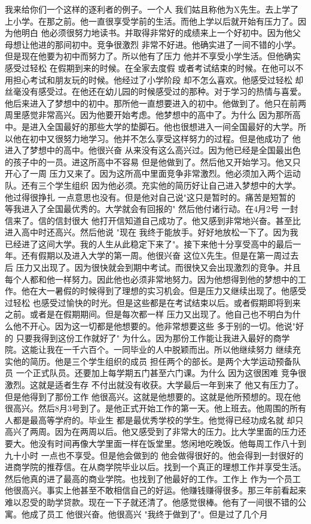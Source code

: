 我来给你们一个这样的逐利者的例子。一个人 我们姑且称他为X先生。去上学了 上小学。在那之前。他一直很享受学前的生活。而他上学以后就开始有压力了。因为他明白 他必须很努力地读书。并取得非常好的成绩来上一个好初中。因为他父母想让他进的那间初中。竞争很激烈 非常不好进。他确实进了一间不错的小学。但是现在他要为初中而努力了。所以他有了压力 他并不享受小学生活。但他确实感受过轻松 在假期到来的时候。在全家去度假 或者考试结束的时候。在他可以不用担心考试和朋友玩的时候。他经过了小学阶段 却不怎么喜欢。他感受过轻松 却丝毫没有感受过。在他还在幼儿园的时候感受过的那种。对于学习的热情与喜爱。他后来进入了梦想中的初中。那所他一直想要进入的初中。他做到了。他只在前两周里感觉非常高兴。因为他要开始考虑。他梦想中的高中了。为什么 因为那所高中。是进入全国最好的那些大学的垫脚石。他也很想进入一间全国最好的大学。所以他在初中又很努力地学习。他并不怎么享受这样努力的过程。但是他成功了 他进入了梦想中的高中。他很兴奋 从来没有这么高兴过。因为他已经是全国最出色的孩子中的一员。进这所高中不容易 但是他做到了。然后他又开始学习。他又只开心了一周 压力又来了。因为这所高中里面竞争非常激烈。他必须加入两个运动队。还有三个学生组织 因为他必须。充实他的简历好让自己进入梦想中的大学。他过得很挣扎 一点意思也没有。但是他对自己说"这只是暂时的。痛苦是短暂的 等我进入了全国最优秀的。大学就会有回报的" 然后他付诸行动。在4月2号 一封信来了。信的信封很大 他打开信知道自己成功了。他又感到非常地兴奋。甚至比进入高中时还高兴。然后他说 "现在 我终于能放手。好好地放松一下了。因为我已经进了这间大学。我的人生从此稳定下来了"。接下来他十分享受高中的最后一年。还有假期以及进入大学的第一周。他很兴奋 这位X先生。但是在第一周过去后 压力又出现了。因为很快就会到期中考试。而很快又会出现激烈的竞争。并且每个人都和他一样努力。因此他也必须非常地努力。因为他想得到他的梦想中的工作。他在大一暑假的时候得到了理想的实习机会。但是压力又继续出现了。他感受过轻松 也感受过愉快的时光。但是这些都是在考试结束以后。或者假期即将到来之前。或者是在假期期间。但是每次都一样 压力又出现了。他自己也不明白为什么他不开心。因为这一切都是他想要的。他非常想要这些 多于别的一切。他说"好的 只要我得到这份工作就好了" 为什么。因为那份工作能让我进入最好的商学院。这能让我在一千六百个。一同毕业的人中脱颖而出。所以他继续努力 继续充实他的简历。他是三个学生组织的成员 担任两个的部长。是两个大学运动预备队员 一个正式队员。还要加上每学期五门甚至六门课。为什么 因为这很困难 竞争很激烈。这就是适者生存 不付出就没有收获。大学最后一年到来了 他又有压力了。但是他得到了那份工作 他很高兴。这就是他想要的。这就是他所预想的。现在他很高兴。然后8月3号到了。是他正式开始工作的第一天。他上班去。他周围的所有人都是最高等学府的。毕业生 都是最优秀学校的学生。他觉得已经功成名就 却只高兴了两周。因为在两周以后。他又感受到了非常大的压力。比大学里面的压力还要大。他没有时间再像大学里面一样在饭堂里。悠闲地吃晚饭。他每周工作八十到九十小时 一点也不享受。但是他会做到的 他会做得很好的。他会得到一封很好的进商学院的推荐信。在从商学院毕业以后。找到一个真正的理想工作并享受生活。然后他真的进了最高的商业学院。也找到了他最好的工作。工作上 作为一个员工 他很高兴。事实上他甚至不敢相信自己的好运。他赚钱赚得很多。那三年前看起来难以忍受的助学贷款。现在一下子就还清了。他感觉很棒。他有了一间很不错的公寓。他成了员工 他很兴奋。他很高兴 "我终于做到了"。但是过了几个月 